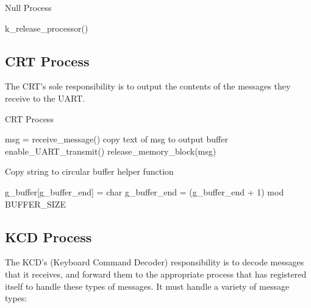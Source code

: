 \documentclass[12pt]{report}
\begin{document}
\begin{algorithm}[H]
	\caption{Null Process}
	\begin{algorithmic}[1]
				\State k_release_processor()
			\EndWhile
		\EndFunction		
	\end{algorithmic}
\end{algorithm}

\subsection{CRT Process}

The CRT's sole responsibility is to output the contents of the messages they receive to the UART.

\begin{algorithm}[H]
	\caption{CRT Process}
	\begin{algorithmic}[1]
	      \State msg = receive\_message()
	      \State copy text of msg to output buffer
	      \State enable\_UART\_transmit()
	      \State release\_memory\_block(msg)
	    \EndWhile
	  \EndFunction
	\end{algorithmic}
\end{algorithm}

\begin{algorithm}[H]
	\caption{Copy string to circular buffer helper function}
	\begin{algorithmic}[1]
	      \State g_buffer[g_buffer_end] = char
	      \State g_buffer_end = (g_buffer_end + 1) mod BUFFER_SIZE
	    \EndFor
	  \EndFunction
	\end{algorithmic}
\end{algorithm}

\subsection{KCD Process}

The KCD's (Keyboard Command Decoder) responsibility is to decode messages that it receives, and forward them to the appropriate process that has registered itself to handle these types of messages.  It must handle a variety of message types:
\end{document}
